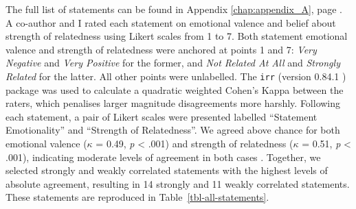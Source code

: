 \documentclass[../main.tex]{subfiles}
\begin{document}
The full list of statements can be found in Appendix
\ref{chap:appendix_A}, page \pageref{chap:appendix_A}. A co-author and I
rated each statement on emotional valence and belief about strength of
relatedness using Likert scales from 1 to 7. Both statement emotional
valence and strength of relatedness were anchored at points 1 and 7:
\emph{Very Negative} and \emph{Very Positive} for the former, and
\emph{Not Related At All} and \emph{Strongly Related} for the latter.
All other points were unlabelled. The \texttt{irr} (version 0.84.1
\cite{irr}) package was used to calculate a quadratic weighted Cohen's
Kappa between the raters, which penalises larger magnitude disagreements
more harshly. Following each statement, a pair of Likert scales were
presented labelled ``Statement Emotionality'' and ``Strength of
Relatedness''. We agreed above chance for both emotional valence
(\(\kappa\) = 0.49, \emph{p} \textless{} .001) and strength of
relatedness (\(\kappa\) = 0.51, \emph{p} \textless{} .001), indicating
moderate levels of agreement in both cases
\cite{cohen_1968, fleiss_1969}. Together, we selected strongly and
weakly correlated statements with the highest levels of absolute
agreement, resulting in 14 strongly and 11 weakly correlated statements.
These statements are reproduced in Table~\ref{tbl-all-statements}.
\end{document}
